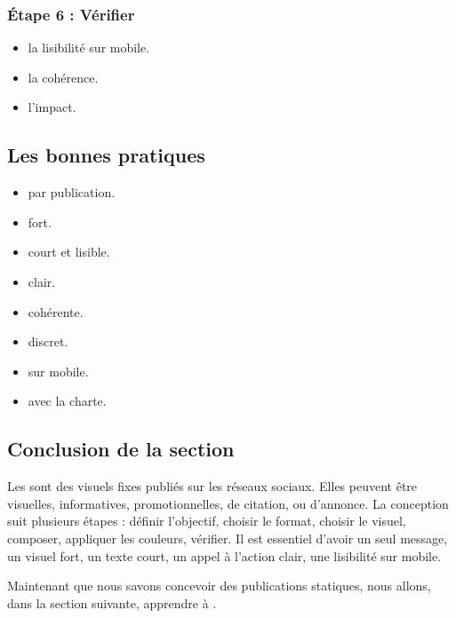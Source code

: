 \subsubsection{Étape 6 : Vérifier}

\begin{itemize}
    \item {} la lisibilité sur mobile.
    \item {} la cohérence.
    \item {} l'impact.
\end{itemize}

\subsection{Les bonnes pratiques}

\begin{itemize}
    \item {} par publication.
    \item {} fort.
    \item {} court et lisible.
    \item {} clair.
    \item {} cohérente.
    \item {} discret.
    \item {} sur mobile.
    \item {} avec la charte.
\end{itemize}

\subsection*{Conclusion de la section}

Les  sont des visuels fixes publiés sur les réseaux sociaux. Elles peuvent être visuelles, informatives, promotionnelles, de citation, ou d'annonce. La conception suit plusieurs étapes : définir l'objectif, choisir le format, choisir le visuel, composer, appliquer les couleurs, vérifier. Il est essentiel d'avoir un seul message, un visuel fort, un texte court, un appel à l'action clair, une lisibilité sur mobile.

Maintenant que nous savons concevoir des publications statiques, nous allons, dans la section suivante, apprendre à .


